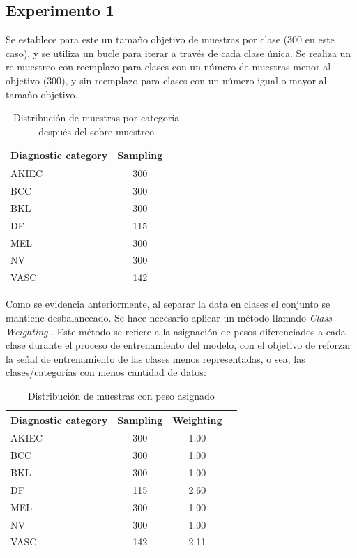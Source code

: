 \subsection{Experimento 1}

Se establece para este un tamaño objetivo de muestras por clase ($300$ en este caso), y se utiliza un bucle para iterar a través de cada clase única. Se realiza un re-muestreo con reemplazo para clases con un número de muestras menor al objetivo ($300$), y sin reemplazo para clases con un número igual o mayor al tamaño objetivo.

\begin{table}[ht]
   \centering
   \begin{tabular}{lccc}
   \hline
   Diagnostic category & Sampling  \\ \hline
   AKIEC & 300 \\
   BCC & 300 \\
   BKL & 300 \\
   DF & 115 \\
   MEL & 300 \\
   NV & 300 \\
   VASC & 142 \\ \hline
   \end{tabular}
   \caption{Distribución de muestras por categoría después del sobre-muestreo}
   \label{tab:sampling_distribution_1}
   \end{table}


Como se evidencia anteriormente, al separar la data en clases el conjunto se mantiene desbalanceado. Se hace necesario aplicar un método llamado \textit{Class Weighting} . Este método se refiere a la asignación de pesos diferenciados a cada clase durante el proceso de entrenamiento del modelo, con el objetivo de reforzar la señal de entrenamiento de las clases menos representadas, o sea, las clases/categorías con menos cantidad de datos:

\begin{table}[ht]
   \centering
   \begin{tabular}{lccc}
   \hline
   Diagnostic category & Sampling  & Weighting\\ \hline
   AKIEC & 300 & 1.00\\
   BCC & 300 & 1.00\\
   BKL & 300 & 1.00\\
   DF & 115 & 2.60\\
   MEL & 300 & 1.00\\
   NV & 300 & 1.00\\
   VASC & 142 & 2.11\\ \hline
   \end{tabular}
   \caption{Distribución de muestras con peso asignado}
   \label{tab:weighting_distribution}
   \end{table}

